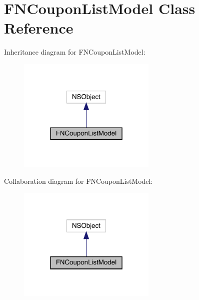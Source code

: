 \hypertarget{interface_f_n_coupon_list_model}{}\section{F\+N\+Coupon\+List\+Model Class Reference}
\label{interface_f_n_coupon_list_model}


Inheritance diagram for F\+N\+Coupon\+List\+Model\+:\nopagebreak
\begin{figure}[H]
\begin{center}
\leavevmode
\includegraphics[width=187pt]{interface_f_n_coupon_list_model__inherit__graph}
\end{center}
\end{figure}


Collaboration diagram for F\+N\+Coupon\+List\+Model\+:\nopagebreak
\begin{figure}[H]
\begin{center}
\leavevmode
\includegraphics[width=187pt]{interface_f_n_coupon_list_model__coll__graph}
\end{center}
\end{figure}
